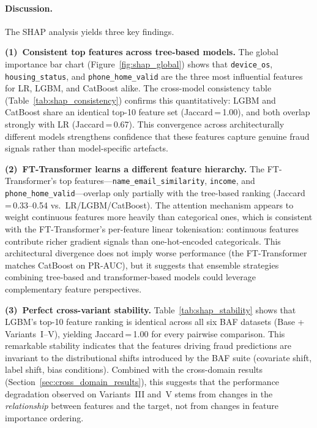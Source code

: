 \paragraph{Discussion.}
The SHAP analysis yields three key findings.

\textbf{(1)~Consistent top features across tree-based models.}
The global importance bar chart (Figure~\ref{fig:shap_global}) shows that \texttt{device\_os}, \texttt{housing\_status}, and \texttt{phone\_home\_valid} are the three most influential features for LR, LGBM, and CatBoost alike.
The cross-model consistency table (Table~\ref{tab:shap_consistency}) confirms this quantitatively: LGBM and CatBoost share an identical top-10 feature set (Jaccard\,=\,1.00), and both overlap strongly with LR (Jaccard\,=\,0.67).
This convergence across architecturally different models strengthens confidence that these features capture genuine fraud signals rather than model-specific artefacts.

\textbf{(2)~FT-Transformer learns a different feature hierarchy.}
The FT-Transformer's top features---\texttt{name\_email\_similarity}, \texttt{income}, and \texttt{phone\_home\_valid}---overlap only partially with the tree-based ranking (Jaccard\,=\,0.33--0.54 vs.\ LR/LGBM/CatBoost).
The attention mechanism appears to weight continuous features more heavily than categorical ones, which is consistent with the FT-Transformer's per-feature linear tokenisation: continuous features contribute richer gradient signals than one-hot-encoded categoricals.
This architectural divergence does not imply worse performance (the FT-Transformer matches CatBoost on PR-AUC), but it suggests that ensemble strategies combining tree-based and transformer-based models could leverage complementary feature perspectives.

\textbf{(3)~Perfect cross-variant stability.}
Table~\ref{tab:shap_stability} shows that LGBM's top-10 feature ranking is identical across all six BAF datasets (Base + Variants~I--V), yielding Jaccard\,=\,1.00 for every pairwise comparison.
This remarkable stability indicates that the features driving fraud predictions are invariant to the distributional shifts introduced by the BAF suite (covariate shift, label shift, bias conditions).
Combined with the cross-domain results (Section~\ref{sec:cross_domain_results}), this suggests that the performance degradation observed on Variants~III and~V stems from changes in the \emph{relationship} between features and the target, not from changes in feature importance ordering.

